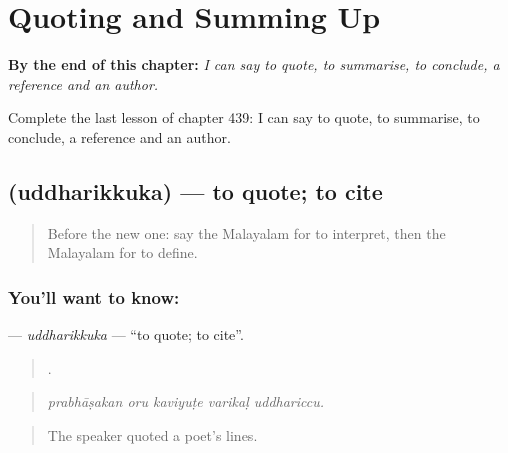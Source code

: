 
\chapter{Quoting and Summing Up}
\label{ch:ml-quoting-and-summing-up}

\begin{chapteropening}
\textbf{By the end of this chapter:} \emph{I can say to quote, to summarise, to conclude, a reference and an author.}

Complete the last lesson of chapter 439: I can say to quote, to summarise, to conclude, a reference and an author.
\end{chapteropening}

\section[\texorpdfstring{\ml{ഉദ്ധരിക്കുക} (uddharikkuka)}{ഉദ്ധരിക്കുക (uddharikkuka)}]{ (uddharikkuka) — to quote; to cite}

\label{lesson:ML-C439-uddharikkuka}



\begin{quote}
Before the new one: say the Malayalam for to interpret, then the Malayalam for to define.
\end{quote}

\subsection*{You'll want to know: }
\textbf{} — \emph{uddharikkuka} — \textquotedblleft{}to quote; to cite\textquotedblright{}.

\begin{quote}
    .
\end{quote}

\begin{quote}
\emph{prabhāṣakan oru kaviyuṭe varikaḷ uddhariccu.}
\end{quote}

\begin{quote}
The speaker quoted a poet's lines.
\end{quote}

